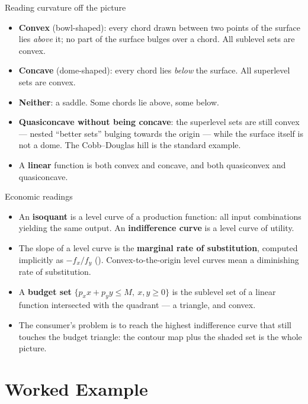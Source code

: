 \begin{rulebox}{Reading curvature off the picture}
\begin{itemize}[leftmargin=1.6em,itemsep=0.3ex]
  \item \textbf{Convex} (bowl-shaped): every chord drawn between two points
        of the surface lies \emph{above} it; no part of the surface bulges
        over a chord. All sublevel sets are convex.
  \item \textbf{Concave} (dome-shaped): every chord lies \emph{below} the
        surface. All superlevel sets are convex.
  \item \textbf{Neither}: a saddle. Some chords lie above, some below.
  \item \textbf{Quasiconcave without being concave}: the superlevel sets
        are still convex --- nested ``better sets'' bulging towards the
        origin --- while the surface itself is not a dome. The Cobb--Douglas
        hill is the standard example.
  \item A \textbf{linear} function is both convex and concave, and both
        quasiconvex and quasiconcave.
\end{itemize}
\end{rulebox}

\begin{rulebox}{Economic readings}
\begin{itemize}[leftmargin=1.6em,itemsep=0.3ex]
  \item An \textbf{isoquant} is a level curve of a production function:
        all input combinations yielding the same output. An
        \textbf{indifference curve} is a level curve of utility.
  \item The slope of a level curve is the \textbf{marginal rate of
        substitution}, computed implicitly as $-f_{x}/f_{y}$
        (). Convex-to-the-origin level curves mean a diminishing
        rate of substitution.
  \item A \textbf{budget set} $\{p_{x}x+p_{y}y\le M,\ x,y\ge0\}$ is the
        sublevel set of a linear function intersected with the quadrant ---
        a triangle, and convex.
  \item The consumer's problem is to reach the highest indifference curve
        that still touches the budget triangle: the contour map plus the
        shaded set is the whole picture.
\end{itemize}
\end{rulebox}

\section{Worked Example}

